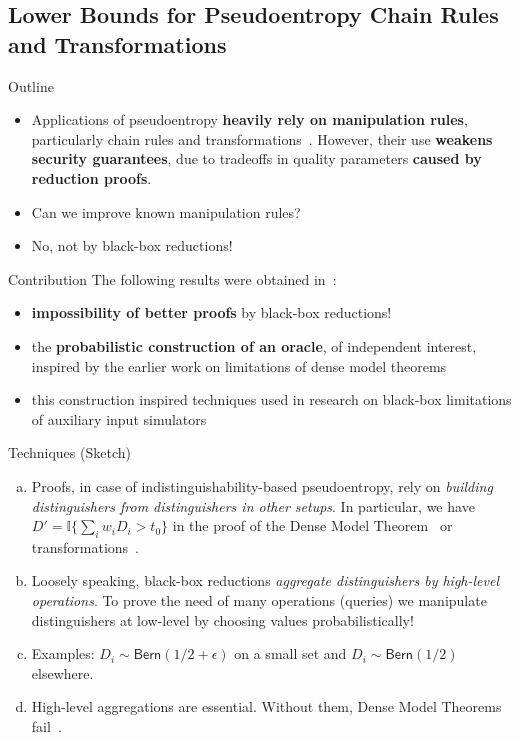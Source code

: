 \documentclass[9pt]{beamer}					%
\begin{document}
\subsection{Lower Bounds for Pseudoentropy Chain Rules and Transformations }

\begin{frame}{Outline}
\begin{itemize}
\item[\emoji{open-book}] Applications of pseudoentropy \textbf{heavily rely on manipulation rules}, particularly chain rules and transformations~\cite{DBLP:conf/random/BarakSW03,DBLP:conf/tcc/FullerOR12}. However, their use \textbf{weakens security guarantees}, due to tradeoffs in quality parameters \textbf{caused by reduction proofs}.
\item[\emoji{question}] Can we improve known manipulation rules?
\item[\emoji{raised-hand}] No, not by black-box reductions!
\end{itemize}
\end{frame}

\begin{frame}{Contribution}
The following results were obtained in~\cite{pietrzak2016pseudoentropy}:
\begin{itemize}
    \item[\emoji{key}] \textbf{impossibility of better proofs} by black-box reductions!
    \item[\emoji{key}] the \textbf{probabilistic construction of an oracle}, of independent interest, inspired by the earlier work on limitations of dense model theorems~\cite{DBLP:journals/eccc/Zhang11}
    \item[\emoji{fire}] this construction inspired techniques used in research on black-box limitations of auxiliary input simulators~\cite{Chen_2018}
\end{itemize}
\end{frame}

\begin{frame}{Techniques (Sketch)}
\newcommand{\D}{\mathsf{\D}}
\begin{enumerate}[(a)]
    \item Proofs, in case of indistinguishability-based pseudoentropy, rely on \emph{building distinguishers from distinguishers in other setups}. In particular, we have 
    $D' = \mathbb{I}\{\sum_i w_i D_i > t_0\}$  in the proof of the Dense Model Theorem~\cite{DBLP:journals/eccc/Zhang11} or transformations~\cite{skorski2015new}.
    \item Loosely speaking, black-box reductions \emph{aggregate distinguishers by high-level operations}. To prove the need of many operations (queries) we manipulate distinguishers at low-level by choosing values probabilistically!
    \item Examples: $D_i\sim \mathsf{Bern}(1/2+\epsilon)$ on a small set and $D_i\sim \mathsf{Bern}(1/2)$ elsewhere.
    \item[\emoji{warning}] High-level aggregations are essential. Without them, Dense Model Theorems fail~\cite{impagliazzo2020comparing}.
\end{enumerate}
\end{frame}
\end{document}

